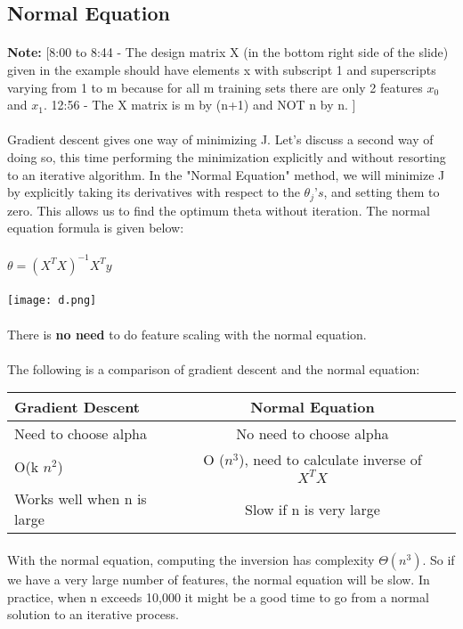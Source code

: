 \documentclass{article}
\begin{document}
\begin{CJK}{UTF8}{gbsn}
\section{Normal Equation}
\paragraph{}
\textbf{Note:} [8:00 to 8:44 - The design matrix X (in the bottom right side of the slide) given in the example should have elements x with subscript 1 and superscripts varying from 1 to m because for all m training sets there are only 2 features $x_{0}$ and $x_{1}$. 12:56 - The X matrix is m by (n+1) and NOT n by n. ]
\paragraph{}
Gradient descent gives one way of minimizing J. Let’s discuss a second way of doing so, this time performing the minimization explicitly and without resorting to an iterative algorithm. In the "Normal Equation" method, we will minimize J by explicitly taking its derivatives with respect to the $\theta_{j}’s$, and setting them to zero. This allows us to find the optimum theta without iteration. The normal equation formula is given below:
\paragraph{}
$\theta=(X^{T}X)^{-1}X^{T}y$
\paragraph{}
\texttt{[image: d.png]}
\paragraph{}
There is \textbf{no need} to do feature scaling with the normal equation.
\paragraph{}
The following is a comparison of gradient descent and the normal equation:
\begin{tabular}{|l|c|r|}
\hline
Gradient Descent&Normal Equation\\
\hline
Need to choose alpha&No need to choose alpha\\
\hline
O(k $n^{2}$)&O ($n^{3}$), need to calculate inverse of $X^{T}X$\\
\hline
Works well when n is large&Slow if n is very large\\
\hline
\end{tabular}
\paragraph{}
With the normal equation, computing the inversion has complexity $\Theta(n^{3})$. So if we have a very large number of features, the normal equation will be slow. In practice, when n exceeds 10,000 it might be a good time to go from a normal solution to an iterative process.
\end{CJK}
\end{document}
